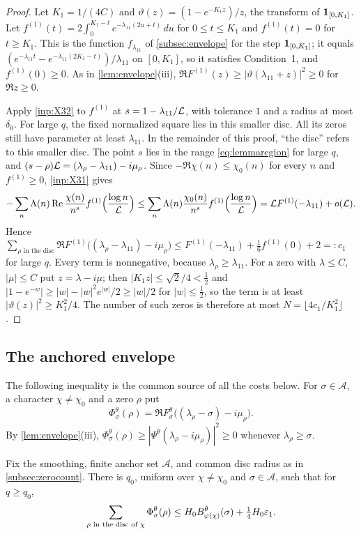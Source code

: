 \begin{proof}
Let $K_1=1/(4C)$ and $\vartheta(z)=(1-e^{-K_1z})/z$, the transform of $\mathbf{1}_{[0,K_1]}$. Let
$f^{(1)}(t)=2\int_0^{K_1-t}e^{-\lambda_{11}(2u+t)}\,du$ for $0\le t\le K_1$ and $f^{(1)}(t)=0$ for
$t\ge K_1$. This is the function $f_{\lambda_{11}}$ of \cref{subsec:envelope} for the step
$\mathbf{1}_{[0,K_1]}$; it equals $(e^{-\lambda_{11}t}-e^{-\lambda_{11}(2K_1-t)})/\lambda_{11}$ on $[0,K_1]$, so
it satisfies Condition~1, and $f^{(1)}(0)\ge0$. As in \cref{lem:envelope}(iii),
$\Re F^{(1)}(z)\ge|\vartheta(\lambda_{11}+z)|^2\ge0$ for $\Re z\ge0$.

Apply \cref{inp:X32} to $f^{(1)}$ at $s=1-\lambda_{11}/\mathcal{L}$, with tolerance $1$ and a radius
at most $\delta_0$. For large $q$, the fixed normalized square lies in this smaller disc.
All its zeros still have parameter at least $\lambda_{11}$. In the remainder of this proof,
``the disc'' refers to this smaller disc. The
point $s$ lies in the range \eqref{eq:lemmaregion} for large $q$, and $(s-\rho)\mathcal{L}=(\lambda_\rho-\lambda_{11})-i\mu_\rho$.
Since $-\Re\chi(n)\le\chi_0(n)$ for every $n$ and $f^{(1)}\ge0$, \cref{inp:X31} gives
\[
  -\sum_n\Lambda(n)\operatorname{Re}\frac{\chi(n)}{n^s}f^{(1)}\Bigl(\frac{\log n}{\mathcal{L}}\Bigr)\le
  \sum_n\Lambda(n)\frac{\chi_0(n)}{n^s}f^{(1)}\Bigl(\frac{\log n}{\mathcal{L}}\Bigr)=\mathcal{L} F^{(1)}(-\lambda_{11})+o(\mathcal{L}).
\]
Hence
$\sum_{\rho\text{ in the disc}}\Re F^{(1)}\bigl((\lambda_\rho-\lambda_{11})-i\mu_\rho\bigr)\le
F^{(1)}(-\lambda_{11})+\frac16f^{(1)}(0)+2=:c_1$ for large $q$. Every term is nonnegative, because
$\lambda_\rho\ge\lambda_{11}$. For a zero with $\lambda\le C$, $|\mu|\le C$ put $z=\lambda-i\mu$; then
$|K_1z|\le\sqrt2/4<\frac12$ and $|1-e^{-w}|\ge|w|-|w|^2e^{|w|}/2\ge|w|/2$ for $|w|\le\frac12$, so
the term is at least $|\vartheta(z)|^2\ge K_1^2/4$. The number of such zeros is therefore at most
$N=\lfloor4c_1/K_1^2\rfloor$.
\end{proof}

\subsection{The anchored envelope}
The following inequality is the common source of all the costs below. For $\sigma\in\mathcal A$, a character
$\chi\ne\chi_0$ and a zero $\rho$ put
\[
  \Phi^\theta_\sigma(\rho)=\Re F^\theta_\sigma\bigl((\lambda_\rho-\sigma)-i\mu_\rho\bigr).
\]
By \cref{lem:envelope}(iii), $\Phi^\theta_\sigma(\rho)\ge|\Psi^\theta(\lambda_\rho-i\mu_\rho)|^2\ge0$ whenever
$\lambda_\rho\ge\sigma$.

\begin{lemma}\label{lem:anchored}
Fix the smoothing, finite anchor set $\mathcal A$, and common disc radius as in
\cref{subsec:zerocount}. There is $q_0$, uniform over $\chi\ne\chi_0$ and
$\sigma\in\mathcal A$, such that for $q\ge q_0$,
\[
  \sum_{\rho\text{ in the disc of }\chi}\Phi^\theta_\sigma(\rho)\le H_0B^\theta_{\varphi(\chi)}(\sigma)+\tfrac14H_0\varepsilon_1 .
\]
\end{lemma}

